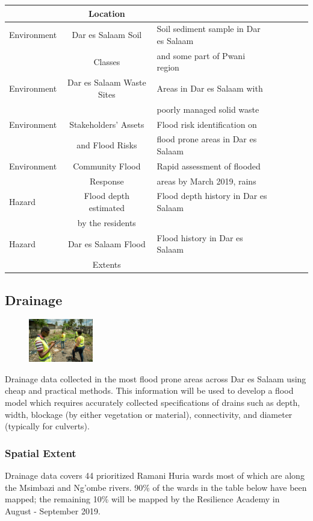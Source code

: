 \documentclass[a4paper,12pt,twoside]{article}
\begin{document}
\begin{tabular}{|l|c|l|c|l|c|l|}
{} & Location & {}\\
\hline
Environment & Dar es Salaam Soil & Soil sediment sample in Dar es Salaam\\
{} & Classes & and some part of Pwani region\\
\hline
Environment & Dar es Salaam Waste Sites & Areas in Dar es Salaam with\\
{} & {} & poorly managed solid waste\\
\hline
Environment & Stakeholders' Assets & Flood risk identification on\\
{} & and Flood Risks & flood prone areas in Dar es Salaam\\
\hline
Environment & Community Flood & Rapid assessment of flooded\\
{} & Response & areas by March 2019, rains\\
\hline
Hazard & Flood depth estimated & Flood depth history in Dar es Salaam\\
{} & by the residents & {}\\
\hline
Hazard & Dar es Salaam Flood & Flood history in Dar es Salaam\\
{} & Extents & {}\\
\hline
\end{tabular}

\newpage

\subsection{Drainage}
\begin{figure} %
    \centering
    \includegraphics[width=0.25\textwidth]{images/Drainage_Mapping.jpg}
\end{figure}

Drainage data collected in the most flood prone areas across Dar es Salaam using cheap  and practical methods. This information will be used to develop a flood model which requires accurately collected specifications of drains such as depth, width, blockage (by either vegetation or material), connectivity, and diameter (typically for culverts).

\subsubsection{Spatial Extent}
Drainage data covers 44 prioritized Ramani Huria wards most of which are along the Msimbazi and Ng’ombe rivers. 90\% of the wards in the table below have been mapped; the remaining 10\% will be mapped by the Resilience Academy in August - September 2019.
\end{document}
